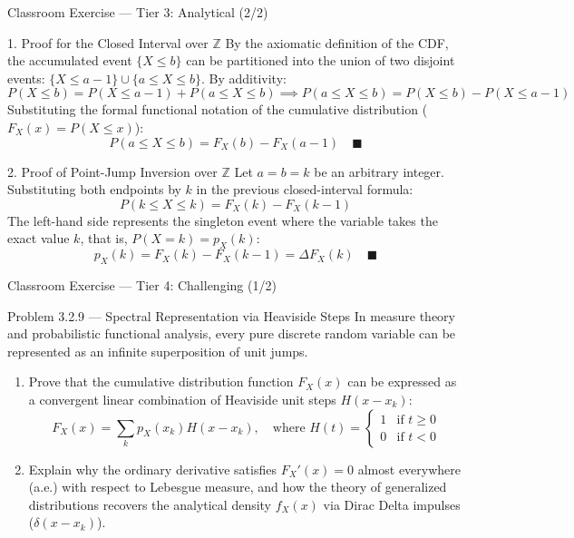 \documentclass[aspectratio=169,xcolor={dvipsnames,table}]{beamer}
\begin{document}
\begin{frame}{Classroom Exercise --- Tier 3: Analytical (2/2)}
	\fontsize{6.5pt}{7.8pt}\selectfont
	\begin{block}{1. Proof for the Closed Interval over $\mathbb{Z}$}
		\fontsize{6.5pt}{7.8pt}\selectfont
		By the axiomatic definition of the CDF, the accumulated event $\{X \le b\}$ can be partitioned into the union of two disjoint events: $\{X \le a-1\} \cup \{a \le X \le b\}$. By additivity:
		$$P(X \le b) = P(X \le a-1) + P(a \le X \le b) \implies P(a \le X \le b) = P(X \le b) - P(X \le a-1)$$
		Substituting the formal functional notation of the cumulative distribution ($F_X(x) = P(X \le x)$):
		$$P(a \le X \le b) = F_X(b) - F_X(a-1) \quad \blacksquare$$
	\end{block}
	\vspace{-0.25cm}
	\pause
	\begin{alertblock}{2. Proof of Point-Jump Inversion over $\mathbb{Z}$}
		\fontsize{6.5pt}{7.8pt}\selectfont
		Let $a = b = k$ be an arbitrary integer. Substituting both endpoints by $k$ in the previous closed-interval formula:
		$$P(k \le X \le k) = F_X(k) - F_X(k-1)$$
		The left-hand side represents the singleton event where the variable takes the exact value $k$, that is, $P(X=k) = p_X(k)$:
		$$p_X(k) = F_X(k) - F_X(k-1) = \Delta F_X(k) \quad \blacksquare$$
	\end{alertblock}
\end{frame}

\begin{frame}{Classroom Exercise --- Tier 4: Challenging (1/2)}
	\begin{block}{Problem 3.2.9 --- Spectral Representation via Heaviside Steps}
		\footnotesize
		In measure theory and probabilistic functional analysis, every pure discrete random variable can be represented as an infinite superposition of unit jumps.
		\begin{enumerate}\itemsep=0.12cm
			\item Prove that the cumulative distribution function $F_X(x)$ can be expressed as a convergent linear combination of Heaviside unit steps $H(x - x_k)$:
			$$F_X(x) = \sum_{k} p_X(x_k) H(x - x_k), \quad \text{where } H(t) = \begin{cases} 1 & \text{if } t \ge 0 \\ 0 & \text{if } t < 0 \end{cases}$$
			\item Explain why the ordinary derivative satisfies $F_X'(x) = 0$ almost everywhere (a.e.) with respect to Lebesgue measure, and how the theory of generalized distributions recovers the analytical density $f_X(x)$ via Dirac Delta impulses ($\delta(x-x_k)$).
		\end{enumerate}
	\end{block}
\end{frame}
\end{document}
